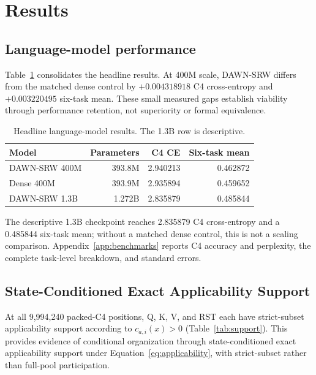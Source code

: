 \documentclass{article}
\newcommand{\DAWN}{DAWN-SRW}
\begin{document}
\section{Results}
\label{sec:results}

\subsection{Language-model performance}

Table~\ref{tab:headline-performance} consolidates the headline results. At
400M scale, \DAWN{} differs from the matched dense control by
\(+0.004318918\) C4 cross-entropy and \(+0.003220495\) six-task mean. These
small measured gaps establish viability through performance retention, not
superiority or formal equivalence.

\begin{table}[t]
\centering
\caption{Headline language-model results. The 1.3B row is descriptive.}
\label{tab:headline-performance}
\small
\begin{tabular}{@{}lrrr@{}}
\toprule
Model & Parameters & C4 CE & Six-task mean\\
\midrule
\DAWN{} 400M & 393.8M & 2.940213 & 0.462872\\
Dense 400M & 393.9M & 2.935894 & 0.459652\\
\DAWN{} 1.3B & 1.272B & 2.835879 & 0.485844\\
\bottomrule
\end{tabular}
\end{table}

The descriptive 1.3B checkpoint reaches 2.835879 C4 cross-entropy and a
0.485844 six-task mean; without a matched dense control, this is not a scaling
comparison. Appendix~\ref{app:benchmarks} reports C4 accuracy and perplexity,
the complete task-level breakdown, and standard errors.

\subsection{State-Conditioned Exact Applicability Support}
\label{sec:support}

At all 9,994,240 packed-C4 positions, Q, K, V, and RST each have strict-subset
applicability support according to \(c_{a,i}(x)>0\) (Table~\ref{tab:support}).
This provides evidence of conditional organization through state-conditioned
exact applicability support under Equation~\ref{eq:applicability}, with
strict-subset rather than full-pool participation.
\end{document}
